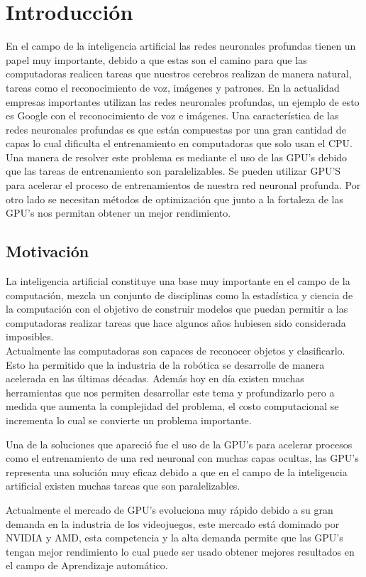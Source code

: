 \chapter{Introducción}
En el campo de la inteligencia artificial las redes neuronales profundas tienen un papel muy importante, debido a que estas son el camino para que las computadoras realicen tareas que nuestros cerebros realizan de manera natural, tareas como el reconocimiento de voz, imágenes y patrones. En la actualidad empresas importantes utilizan las redes neuronales profundas, un ejemplo de esto es Google con el reconocimiento de voz e imágenes. Una característica de las redes neuronales profundas es que están compuestas por una gran cantidad de capas lo cual dificulta el entrenamiento en computadoras que solo usan el CPU. Una manera de resolver este problema es mediante el uso de las GPU's debido que las tareas de entrenamiento son paralelizables. Se pueden utilizar GPU'S para acelerar el proceso de entrenamientos de nuestra red neuronal profunda. Por otro lado se necesitan métodos de optimización que junto a la fortaleza de las GPU's nos permitan obtener un mejor rendimiento.

\section{Motivación}
La inteligencia artificial constituye una base muy importante en el campo de la computación, mezcla un conjunto de disciplinas como la estadística y ciencia de la computación con el objetivo de construir modelos que puedan permitir a las computadoras realizar tareas que hace algunos años hubiesen sido considerada imposibles.\\
Actualmente las computadoras son capaces de reconocer objetos y clasificarlo. Esto ha permitido que la industria de la robótica se desarrolle de manera acelerada en las últimas décadas.
 Además hoy en día existen muchas herramientas que nos permiten desarrollar este tema y profundizarlo pero a medida que aumenta la complejidad del problema, el costo computacional se incrementa lo cual se convierte un problema importante.

 Una de la soluciones que apareció fue el uso de la GPU's para acelerar procesos como el entrenamiento de una red neuronal con muchas capas ocultas, las GPU's representa una solución muy eficaz debido a que en el campo de la inteligencia artificial existen muchas tareas que son paralelizables.

Actualmente el mercado de GPU's evoluciona muy rápido debido a su gran demanda en la industria de los videojuegos, este mercado está dominado por NVIDIA y AMD, esta competencia y la alta demanda permite que las GPU's tengan mejor rendimiento lo cual puede ser usado obtener mejores resultados en el campo de Aprendizaje automático. 

